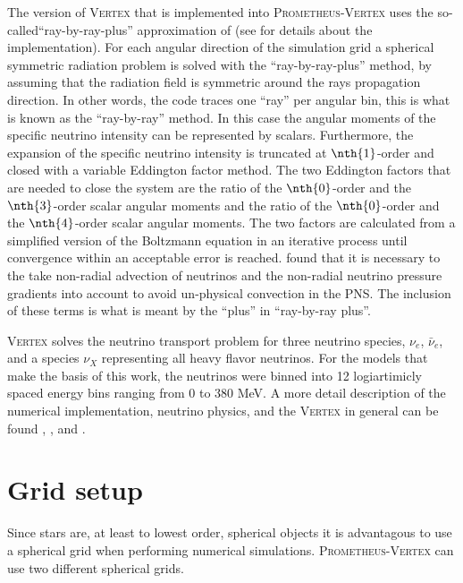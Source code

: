 The version of \textsc{Vertex} that is implemented into \textsc{Prometheus-Vertex} uses
the so-called``ray-by-ray-plus'' approximation of \cite{buras_06a} (see \cite{hanke_phd} for details about the implementation).
For each angular direction of the simulation grid a spherical symmetric radiation problem is solved
with the ``ray-by-ray-plus'' method, by assuming that the radiation field is symmetric around the rays propagation direction.
In other words, the code traces one ``ray'' per angular bin, this is what is known as the ``ray-by-ray'' method.
In this case the angular moments of the specific neutrino intensity can be represented by scalars.
Furthermore, the expansion of the specific neutrino intensity is truncated at $\nth{1}$-order and
closed with a variable Eddington factor method. The two Eddington factors that are needed to close the system are the ratio of
the $\nth{0}$-order and the $\nth{3}$-order scalar angular moments and the ratio of the $\nth{0}$-order and the $\nth{4}$-order scalar angular moments. The two factors are calculated from a simplified version of the Boltzmann equation in an iterative process until convergence within an acceptable error is reached. 
\cite{buras_06b} found that it is necessary to the take non-radial advection of neutrinos and 
the non-radial neutrino pressure gradients into account to avoid un-physical convection in the PNS. 
The inclusion of these terms is what is meant by the ``plus'' in ``ray-by-ray plus''.

\textsc{Vertex} solves the neutrino transport problem for three neutrino species, $\nu_e$, $\bar{\nu}_e$, and a species $\nu_X$ representing
all heavy flavor neutrinos. 
For the models that make the basis of this work, the neutrinos were binned into 12 logiartimicly spaced energy bins ranging from 0 to 380 MeV.  
A more detail description of the numerical implementation, neutrino physics, and the \textsc{Vertex} in general can
be found \cite{rampp_02}, \cite{hanke_phd}, and \cite{melson_phd}.

\section{Grid setup}
Since stars are, at least to lowest order, spherical objects it is advantagous to use a spherical grid when performing numerical simulations.
\textsc{Prometheus-Vertex} can use two different spherical grids.

